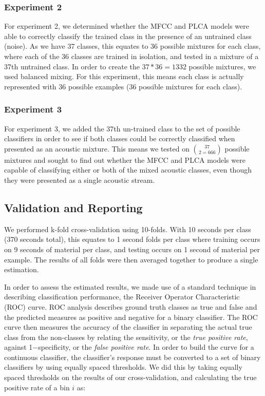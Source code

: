 \subsubsection{Experiment 2}
For experiment 2, we determined whether the MFCC and PLCA models were able to correctly classify the trained class in the presence of an untrained class (noise).  As we have 37 classes, this equates to 36 possible mixtures for each class, where each of the 36 classes are trained in isolation, and tested in a mixture of a 37th untrained class.  In order to create the $37*36 = 1332$ possible mixtures, we used balanced mixing.  For this experiment, this means each class is actually represented with 36 possible examples (36 possible mixtures for each class).  

\subsubsection{Experiment 3}
For experiment 3, we added the 37th un-trained class to the set of possible classifiers in order to see if both classes could be correctly classified when presented as an acoustic mixture.  This means we tested on $37 \choose 2 = 666$ possible mixtures and sought to find out whether the MFCC and PLCA models were capable of classifying either or both of the mixed acoustic classes, even though they were presented as a single acoustic stream.


\subsection{Validation and Reporting}
\label{sec:ROC}
We performed k-fold cross-validation using 10-folds.  With 10 seconds per class (370 seconds total), this equates to 1 second folds per class where training occurs on 9 seconds of material per class, and testing occurs on 1 second of material per example. The results of all folds were then averaged together to produce a single estimation.

In order to assess the estimated results, we made use of a standard technique in describing classification performance, the Receiver Operator Characteristic (ROC) curve.  ROC analysis describes ground truth classes as true and false and the predicted measures as positive and negative for a binary classifier.  The ROC curve then measures the accuracy of the classifier in separating the actual true class from the non-classes by relating the sensitivity, or the \textit{true positive rate}, against 1$-$specificity, or the \textit{false positive rate}.   In order to build the curve for a continuous classifier, the classifier's response must be converted to a set of binary classifiers by using equally spaced thresholds.  We did this by taking equally spaced thresholds on the results of our cross-validation, and calculating the true positive rate of a bin $i$ as: 

